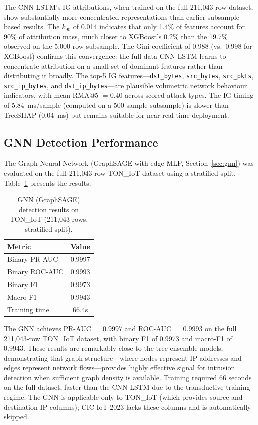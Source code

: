\documentclass[12pt,a4paper]{report}
\begin{document}
The CNN-LSTM's IG attributions, when trained on the full 211,043-row dataset, show substantially more concentrated representations than earlier subsample-based results. The $k_{90}$ of 0.014 indicates that only 1.4\% of features account for 90\% of attribution mass, much closer to XGBoost's 0.2\% than the 19.7\% observed on the 5,000-row subsample. The Gini coefficient of 0.988 (vs.\ 0.998 for XGBoost) confirms this convergence: the full-data CNN-LSTM learns to concentrate attribution on a small set of dominant features rather than distributing it broadly. The top-5 IG features---\texttt{dst\_bytes}, \texttt{src\_bytes}, \texttt{src\_pkts}, \texttt{src\_ip\_bytes}, and \texttt{dst\_ip\_bytes}---are plausible volumetric network behaviour indicators, with mean RMA@5 $= 0.40$ across scored attack types. The IG timing of 5.84~ms/sample (computed on a 500-sample subsample) is slower than TreeSHAP (0.04~ms) but remains suitable for near-real-time deployment.

\subsection{GNN Detection Performance}
\label{sec:gnn-results}

The Graph Neural Network (GraphSAGE with edge MLP, Section~\ref{sec:gnn}) was evaluated on the full 211,043-row TON\_IoT dataset using a stratified split. Table~\ref{tab:gnn} presents the results.

\begin{table}[H]
\centering
\caption{GNN (GraphSAGE) detection results on TON\_IoT (211,043 rows, stratified split).}
\label{tab:gnn}
\begin{tabular}{lc}
\toprule
\textbf{Metric} & \textbf{Value} \\
\midrule
Binary PR-AUC & 0.9997 \\
Binary ROC-AUC & 0.9993 \\
Binary F1 & 0.9973 \\
Macro-F1 & 0.9943 \\
Training time & 66.4s \\
\bottomrule
\end{tabular}
\end{table}

The GNN achieves PR-AUC $= 0.9997$ and ROC-AUC $= 0.9993$ on the full 211,043-row TON\_IoT dataset, with binary F1 of 0.9973 and macro-F1 of 0.9943. These results are remarkably close to the tree ensemble models, demonstrating that graph structure---where nodes represent IP addresses and edges represent network flows---provides highly effective signal for intrusion detection when sufficient graph density is available. Training required 66 seconds on the full dataset, faster than the CNN-LSTM due to the transductive training regime. The GNN is applicable only to TON\_IoT (which provides source and destination IP columns); CIC-IoT-2023 lacks these columns and is automatically skipped.
\end{document}
